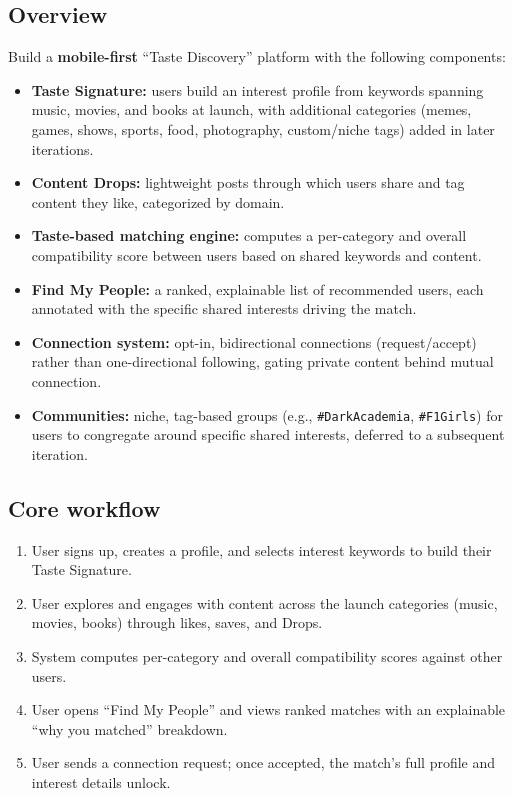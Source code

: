 \documentclass[11pt,a4paper]{article}
\begin{document}
\subsection{Overview}
Build a \textbf{mobile-first} ``Taste Discovery'' platform with the following components:
\begin{itemize}[leftmargin=0.7cm]
    \item \textbf{Taste Signature:} users build an interest profile from keywords spanning music, movies, and books at launch, with additional categories (memes, games, shows, sports, food, photography, custom/niche tags) added in later iterations.
    \item \textbf{Content Drops:} lightweight posts through which users share and tag content they like, categorized by domain.
    \item \textbf{Taste-based matching engine:} computes a per-category and overall compatibility score between users based on shared keywords and content.
    \item \textbf{Find My People:} a ranked, explainable list of recommended users, each annotated with the specific shared interests driving the match.
    \item \textbf{Connection system:} opt-in, bidirectional connections (request/accept) rather than one-directional following, gating private content behind mutual connection.
    \item \textbf{Communities:} niche, tag-based groups (e.g., \texttt{\#DarkAcademia}, \texttt{\#F1Girls}) for users to congregate around specific shared interests, deferred to a subsequent iteration.
\end{itemize}

\subsection{Core workflow}
\begin{enumerate}[leftmargin=0.7cm]
    \item User signs up, creates a profile, and selects interest keywords to build their Taste Signature.
    \item User explores and engages with content across the launch categories (music, movies, books) through likes, saves, and Drops.
    \item System computes per-category and overall compatibility scores against other users.
    \item User opens ``Find My People'' and views ranked matches with an explainable ``why you matched'' breakdown.
    \item User sends a connection request; once accepted, the match's full profile and interest details unlock.
\end{enumerate}
\end{document}
